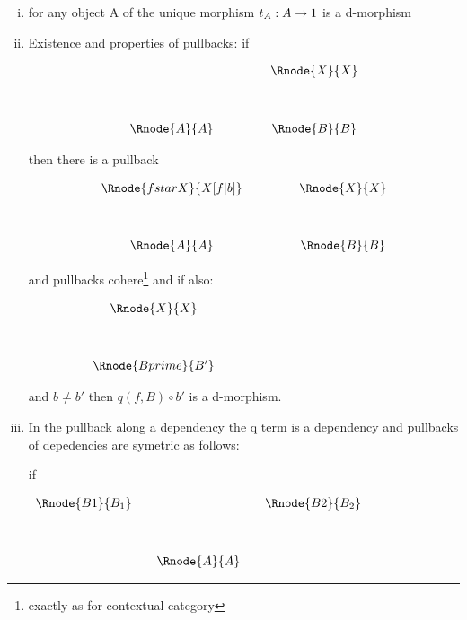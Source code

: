 \documentclass[10pt,a4paper]{article}
\begin{document}
\begin{enumerate} [(i)]
	\item for any object A of  the unique morphism $t_A:A \rightarrow 1$ is a d-morphism
	\item Existence and properties of pullbacks: if
\begin{center}
\begin{displaymath}
\begin{array}{cp{.9cm}c}
            & & \Rnode{X}{X} \\ [1.2cm]
\Rnode{A}{A}& & \Rnode{B}{B} \\
\end{array}
\end{displaymath}
\end{center}

then there is a pullback 
\vspace{3mm}
\begin{center}
\begin{displaymath}
\begin{array}{cp{.9cm}c}
\Rnode{fstarX}{X[f|b]} & & \Rnode{X}{X}\\ [1.2cm]
\Rnode{A}{A}         & & \Rnode{B}{B}
\end{array}
\end{displaymath}
\end{center}
and pullbacks cohere\footnote{exactly as for contextual category}
and if also:
\begin{center}
$
\begin{array}{cp{.9cm}c}
            & & \Rnode{X}{X} \\ [1.2cm]
& & \Rnode{Bprime}{B'} \\
\end{array}
$
\end{center}
and $b \neq b'$ then $q(f,B) \circ b'$ is a d-morphism. 

\item In the pullback  along a dependency the q term is a dependency and pullbacks of depedencies are symetric as follows:

\noindent if
\begin{center}
$
\begin{array}{cp{0cm}cp{0cm}c}
\Rnode{B1}{B_1}& &            &  &\Rnode{B2}{B_2} \\ [1.2cm]
               & &\Rnode{A}{A}& &
\end{array}
$
\end{center}


\end{enumerate}
\end{document}

